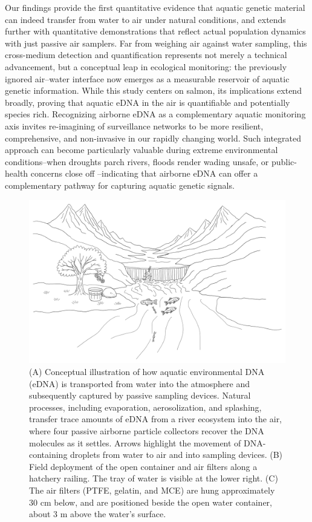 \documentclass{article}
\begin{document}
Our findings provide the first quantitative evidence that aquatic genetic material can indeed transfer from water to air under natural conditions, and extends further with quantitative demonstrations that reflect actual population dynamics with just passive air samplers. Far from weighing air against water sampling, this cross-medium detection and quantification represents not merely a technical advancement, but a conceptual leap in ecological monitoring: the previously ignored air–water interface now emerges as a measurable reservoir of aquatic genetic information. While this study centers on salmon, its implications extend broadly, proving that aquatic eDNA in the air is quantifiable and potentially species rich. Recognizing airborne eDNA as a complementary aquatic monitoring axis invites re-imagining of surveillance networks to be more resilient, comprehensive, and non-invasive in our rapidly changing world. Such integrated approach can become particularly valuable during extreme environmental conditions--when droughts parch rivers, floods render wading unsafe, or public-health concerns close off --indicating that airborne eDNA can offer a complementary pathway for capturing aquatic genetic signals.


\begin{figure}[tbhp] 
\centering
\includegraphics[width=13.5cm]{Plots/Figure_1_draw.pdf}  
\caption{(A) Conceptual illustration of how aquatic environmental DNA (eDNA) is transported from water into the atmosphere and subsequently captured by passive sampling devices. Natural processes, including evaporation, aerosolization, and splashing, transfer trace amounts of eDNA from a river ecosystem into the air, where four passive airborne particle collectors recover the DNA molecules as it settles. Arrows highlight the movement of DNA-containing droplets from water to air and into sampling devices. (B) Field deployment of the open container and air filters along a hatchery railing. The tray of water is visible at the lower right. (C) The air filters (PTFE, gelatin, and MCE) are hung approximately 30 cm below, and are positioned beside the open water container, about 3 m above the water’s surface.}
\label{fig:AI_physical_model}
\end{figure}
\end{document}

